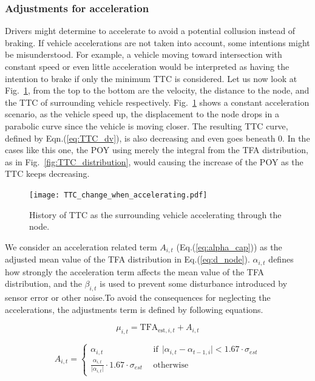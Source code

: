 \subsubsection{Adjustments for acceleration}
Drivers might determine to accelerate to avoid a potential collusion instead of braking. If vehicle accelerations are not taken into account, some intentions might be misunderstood. For example, a vehicle moving toward intersection with constant speed or even little acceleration would be interpreted as having the intention to brake if only the minimum TTC is considered. Let us now look at Fig.~\ref{fig:TTC_acc}, from the top to the bottom are the velocity, the distance to the node, and the TTC of surrounding vehicle respectively. Fig.~\ref{fig:TTC_acc} shows a constant acceleration scenario, as the vehicle speed up, the displacement to the node drops in a parabolic curve since the vehicle is moving closer. The resulting TTC curve, defined by Eqn.(\ref{eq:TTC_dv}), is also decreasing and even goes beneath 0. In the cases like this one, the POY using merely the integral from the TFA distribution, as in Fig.~\ref{fig:TTC_distribution}, would causing the increase of the POY as the TTC keeps decreasing.

\begin{figure}[htbp!]
\begin{center}
\texttt{[image: TTC\_change\_when\_accelerating.pdf]}
\end{center}
\caption{History of TTC as the surrounding vehicle accelerating through the node.}
\label{fig:TTC_acc} 
\end{figure}

We consider an acceleration related term $A_{i,t}$ (Eq.(\ref{eq:alpha_cap})) as the adjusted mean value of the TFA distribution in Eq.(\ref{eq:d_node}). $\alpha_{i,t}$ defines how strongly the acceleration term affects the mean value of the TFA distribution, and the $\beta_{i,t}$ is used to prevent some disturbance introduced by sensor error or other noise.To avoid the consequences for neglecting the accelerations, the adjustments term is defined by following equations.

\begin{equation}
\mu_{i,t} = {\mathrm{TFA}}_{\mathrm{est}, i,t} + A_{i,t}
\label{eq:d_node}
\end{equation}

\begin{equation}
    A_{i,t} = 
    \begin{cases} 
      \alpha_{i,t} &~~\text{if}~~ \lvert \alpha_{i,t} - \alpha_{t-1,i}  \rvert < 1.67 \cdot \sigma_{est}\\
      \frac{\alpha_{i,t}}{\lvert \alpha_{i,t} \rvert} \cdot 1.67 \cdot \sigma_{est} &~~\text{otherwise}
    \end{cases}
\label{eq:alpha_cap}
\end{equation}


